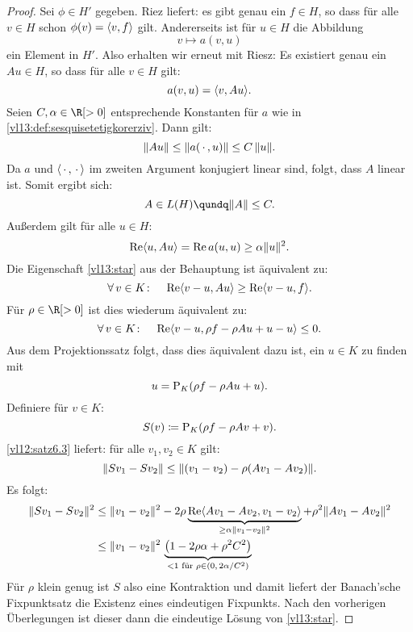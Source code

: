 \begin{proof}
    Sei $\phi\in H'$ gegeben. Riez  liefert:
    es gibt genau ein $f\in H$, so dass für alle $v\in H$ schon
    $\phi(v)=\SP{v,f}$ gilt. Andererseits ist für $u\in H$ die Abbildung
    \[ v \mapsto a(v,u) \]
    ein Element in $H'$. Also erhalten wir erneut mit Riesz: Es existiert genau
    ein $Au\in H$, so dass für alle $v\in H$ gilt:
    \[ a(v,u) = \SP{v, Au}  . \]
    Seien $C,\alpha\in\R[>0]$ entsprechende Konstanten für $a$ wie in 
    \cref{vl13:def:sesquisetetigkorerziv}. Dann gilt:
    \[ \lVert Au\rVert \leq \lVert a(\,\cdot\,,u)\rVert \leq C\,\lVert u\rVert . \]
    Da $a$ und $\emptySP$ im zweiten Argument konjugiert linear sind, folgt,
    dass $A$ linear ist. Somit ergibt sich:
    \[ A\in L(H) \qundq \norm{A} \leq C   . \]
    Außerdem gilt für alle $u\in H$:
    \[ \Re\SP{u,Au} = \Re a(u,u) \geq \alpha\norm{u}^2  . \]
    Die Eigenschaft \eqref{vl13:star} aus der Behauptung ist äquivalent zu:
    \[ \forall\,v\in K\colon\quad
        \Re\SP{v-u,Au} \geq \Re\SP{v-u,f}
    . \]
    Für $\rho\in\R[>0]$ ist dies wiederum äquivalent zu:
    \[ \forall\,v\in K\colon\quad
        \Re\SP{v-u, \rho f - \rho Au + u - u} \leq 0
    . \]
    Aus dem Projektionssatz  folgt, dass dies
    äquivalent dazu ist, ein $u\in K$ zu finden mit
    \[ u = \operatorname{P}_K(\rho f - \rho Au + u)  . \]
    Definiere für $v\in K$:
    \[ S(v) \coloneqq \operatorname{P}_K(\rho f - \rho Av + v) . \]
    \cref{vl12:satz6.3} liefert: für alle $v_1,v_2\in K$ gilt:
    \[ \lVert Sv_1 - Sv_2\rVert \leq \lVert(v_1-v_2) - \rho (Av_1-Av_2)\rVert  . \]
    Es folgt:
    \begin{align*}
        \norm{Sv_1-Sv_2}^2
        &\leq \norm{v_1-v_2}^2 - 2\rho 
        \underbrace{\Re\SP{Av_1-Av_2, v_1-v_2}}_{\geq \alpha\norm{v_1-v_2}^2} 
            + \rho^2 \norm{Av_1-Av_2}^2
        \\
        &\leq
        \norm{v_1-v_2}^2 \, 
        \underbrace{\bigl( 1-2\rho\alpha + \rho^2 C^2 \bigr)}_{<1 \text{ für }
        \rho\in (0,\, 2\alpha/C^2)}
    \end{align*}
    Für $\rho$ klein genug ist $S$ also eine Kontraktion und damit liefert der
    Banach'sche Fixpunktsatz die Existenz eines eindeutigen Fixpunkts. Nach den
    vorherigen Überlegungen ist dieser dann die eindeutige Lösung von
    \eqref{vl13:star}.
    

\end{proof}
